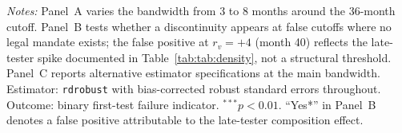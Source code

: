 \begin{table}[htbp]
\begin{threeparttable}
\begin{tabular}{lccccc}
\bottomrule
\end{tabular}
\begin{tablenotes}
\item {\footnotesize \textit{Notes:} Panel~A varies the bandwidth from 3 to 8 months around the 36-month cutoff. Panel~B tests whether a discontinuity appears at false cutoffs where no legal mandate exists; the false positive at $r_v = +4$ (month 40) reflects the late-tester spike documented in Table~\ref{tab:tab:density}, not a structural threshold. Panel~C reports alternative estimator specifications at the main bandwidth. Estimator: \texttt{rdrobust} with bias-corrected robust standard errors throughout. Outcome: binary first-test failure indicator. $^{***}p < 0.01$. ``Yes*'' in Panel~B denotes a false positive attributable to the late-tester composition effect.}
\end{tablenotes}
\end{threeparttable}
\end{table}
